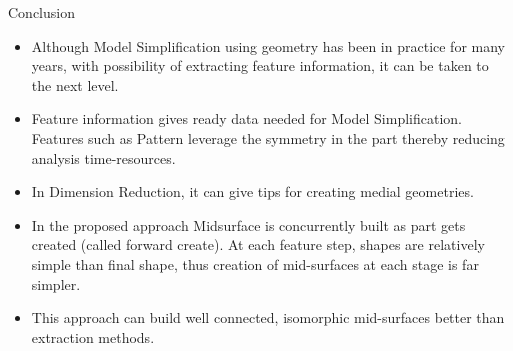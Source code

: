 
\begin{frame}[<+-| alert@+>]{Conclusion}
\begin{itemize}[noitemsep,label=\textbullet,topsep=2pt,parsep=2pt,partopsep=2pt]
\item Although Model Simplification using geometry has been in practice for many years, with possibility of extracting feature information, it can be taken to the next level. 
\item Feature information gives ready data needed for Model Simplification.  Features such as Pattern leverage the symmetry in the part thereby reducing analysis time-resources. 
\item In Dimension Reduction, it can give tips for creating medial geometries.
\item In the proposed approach Midsurface is concurrently built as part gets created (called forward create). At each feature step, shapes are relatively simple than final shape, thus creation of mid-surfaces at each stage is far simpler. 
\item This approach can build well connected, isomorphic mid-surfaces better than extraction methods. 
\end{itemize}


\end{frame}
